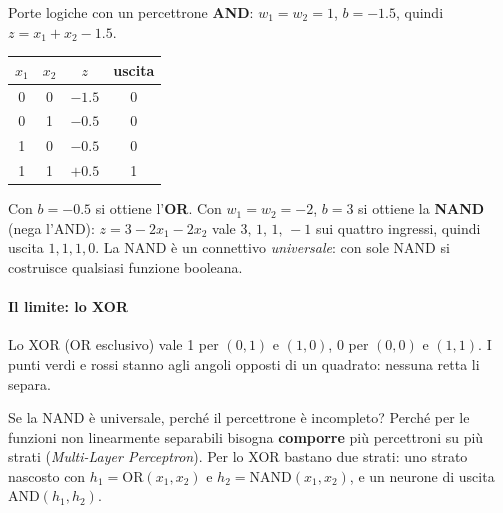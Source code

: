 \documentclass[12pt]{extarticle}
\begin{document}
\begin{esempiobox}{Porte logiche con un percettrone}
\textbf{AND}: $w_1=w_2=1$, $b=-1.5$, quindi $z=x_1+x_2-1.5$.
\begin{center}
\small
\begin{tabular}{cccc}
    \toprule
    $x_1$ & $x_2$ & $z$ & uscita \\
    \midrule
    0 & 0 & $-1.5$ & 0 \\
    0 & 1 & $-0.5$ & 0 \\
    1 & 0 & $-0.5$ & 0 \\
    1 & 1 & $+0.5$ & 1 \\
    \bottomrule
\end{tabular}
\end{center}
Con $b=-0.5$ si ottiene l'\textbf{OR}. Con $w_1=w_2=-2$, $b=3$ si ottiene la \textbf{NAND} (nega l'AND): $z=3-2x_1-2x_2$ vale $3,\,1,\,1,\,-1$ sui quattro ingressi, quindi uscita $1,1,1,0$. La NAND è un connettivo \emph{universale}: con sole NAND si costruisce qualsiasi funzione booleana.
\end{esempiobox}

\paragraph{Il limite: lo XOR}
Lo XOR (OR esclusivo) vale 1 per $(0,1)$ e $(1,0)$, 0 per $(0,0)$ e $(1,1)$. I punti verdi e rossi stanno agli angoli opposti di un quadrato: nessuna retta li separa.

\begin{center}
\end{center}

\noindent Se la NAND è universale, perché il percettrone è incompleto? Perché per le funzioni non linearmente separabili bisogna \textbf{comporre} più percettroni su più strati (\emph{Multi-Layer Perceptron}). Per lo XOR bastano due strati: uno strato nascosto con $h_1=\mathrm{OR}(x_1,x_2)$ e $h_2=\mathrm{NAND}(x_1,x_2)$, e un neurone di uscita $\mathrm{AND}(h_1,h_2)$.
\end{document}
